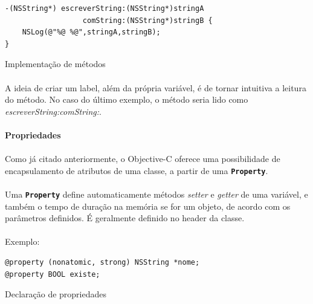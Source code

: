 \documentclass[a4paper,12pt,brazil,doubleside]{book}
\begin{document}
\begin{singlespace}
\begin{listing}
\begin{verbatim}
-(NSString*) escreverString:(NSString*)stringA
                  comString:(NSString*)stringB {
	NSLog(@"%@ %@",stringA,stringB);
}
\end{verbatim}
\caption{Implementação de métodos}
\end{listing}

\paragraph{}A ideia de criar um label, além da própria variável, é de tornar intuitiva a leitura do método. No caso do último exemplo, o método seria lido como \emph{escreverString:comString:}.\\

\paragraph{}\textbf{Propriedades}

\paragraph{}Como já citado anteriormente, o Objective-C oferece uma possibilidade de encapsulamento de atributos de uma classe, a partir de uma \texttt{\textbf{Property}}.
\paragraph{}Uma \texttt{\textbf{Property}} define automaticamente métodos \emph{setter} e \emph{getter} de uma variável, e também o tempo de duração na memória se for um objeto, de acordo com os parâmetros definidos. É geralmente definido no header da classe.
\paragraph{}Exemplo:

\begin{listing}[H]
\begin{verbatim}
@property (nonatomic, strong) NSString *nome;
@property BOOL existe;
\end{verbatim}
\caption{Declaração de propriedades}
\end{listing}


\end{singlespace}
\end{document}
